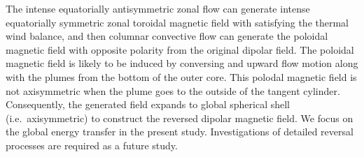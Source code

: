 {\color{red}
The intense equatorially antisymmetric zonal flow can generate intense equatorially symmetric zonal toroidal magnetic field with satisfying the thermal wind balance, and then columnar convective flow can generate the poloidal magnetic field with opposite polarity from the original dipolar field.
}
{\color{green}
The poloidal magnetic field is likely to be induced by conversing and upward flow motion along with the plumes from the bottom of the outer core.
This polodal magnetic field is not axisymmetric when the plume goes to the outside of the tangent cylinder. 
Consequently, the generated field expands to global spherical shell (i.e.\ axisymmetric) to construct the reversed dipolar magnetic field.
We focus on the global energy transfer in the present study. 
Investigations of detailed reversal processes are required as a future study.
}


